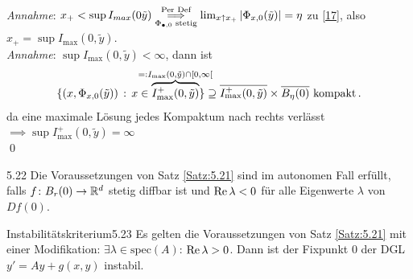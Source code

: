 \documentclass[a4paper]{article}
\begin{document}
\begin{Beweis}
\begin{align*}
\end{align*}
\textit{Annahme}: $x_+<\sup I_{max}(0\tilde{y})\overset{\text{Per Def}}{\underset{\Phi_{\bullet,0}\text{ stetig}}{\implies}}\lim_{x\uparrow x_+}|\Phi_{x,0}(\tilde{y})|=\eta$ \lightning{} zu \eqref{17}, also $x_+=\sup I_{\max}(0,\tilde{y})$.\\
\textit{Annahme}: $\sup I_{\max}(0,\tilde{y})<\infty$, dann ist
\[\{(x,\Phi_{x,0}(\tilde{y}))\,:\,x\in \overbrace{I_{\max}^+(0,\tilde{y})}^{\mathclap{=:I_{\max}(0,\tilde{y})\cap [0,\infty[}}\}\supseteq \overline{I_{\max}^+(0,\tilde{y})}\times \overline{B_{\eta}(0)}\te{kompakt}\,.\]
\lightning{} da eine maximale Lösung jedes Kompaktum nach rechts verlässt $\implies \sup I_{\max}^+(0,\tilde{y})=\infty$\\\qed
\end{Beweis}

\begin{Bemerkung}{}{5.22}
Die Voraussetzungen von Satz \ref{Satz:5.21} sind im autonomen Fall erfüllt, falls $f\colon B_r(0)\to\mathbb R^d$ stetig diffbar ist und $\operatorname{\textrm{Re}} \lambda <0$ für alle Eigenwerte $\lambda$ von $Df(0)$.
\end{Bemerkung}

\begin{Satz}{Instabilitätskriterium}{5.23}
Es gelten die Voraussetzungen von Satz \ref{Satz:5.21} mit einer Modifikation: $\exists\lambda\in\mathrm{spec}(A)$: $\operatorname{\textrm{Re}}\lambda>0$. Dann ist der Fixpunkt 0 der DGL $y'=Ay+g(x,y)$ instabil.
\end{Satz}
\end{document}
